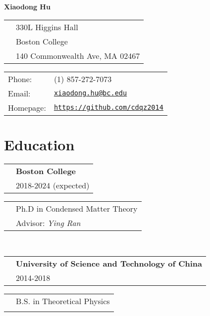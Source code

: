 \documentclass{article}
\def\name{Xiaodong Hu}
\begin{document}
\vspace{-2in}
{\huge\bf\name}
\hfill\\

\begin{minipage}{0.5\linewidth}
    \begin{tabular}{ll}
        & 330L Higgins Hall\\
        & Boston College\\
        & 140 Commonwealth Ave, MA 02467
    \end{tabular}
\end{minipage}
\begin{minipage}{0.5\linewidth}
  \begin{tabular}{ll}
    Phone: & (1) 857-272-7073 \\
    Email: & \href{mailto:xiaodong.hu@bc.edu}{\tt xiaodong.hu@bc.edu} \\
    Homepage: & \href{https://github.com/cdqz2014}{\tt https://github.com/cdqz2014} \\
  \end{tabular}
\end{minipage}

\makebox[\linewidth]{\rule{\linewidth}{0.4pt}}


\section*{Education}
\begin{minipage}{0.55\linewidth}
    \begin{tabular}{ll}
        & {\bf Boston College} \\
        & 2018-2024 (expected)        
    \end{tabular}
\end{minipage}
\begin{minipage}{0.45\linewidth}
    \begin{tabular}{ll}
        & Ph.D in Condensed Matter Theory\\
        & Advisor: \emph{Ying Ran}
    \end{tabular}
\end{minipage}
\\[1em]
\begin{minipage}{0.55\linewidth}
    \begin{tabular}{ll}
        & {\bf University of Science and Technology of China}\\
        & 2014-2018 
    \end{tabular}
\end{minipage}
\begin{minipage}{0.45\linewidth}
    \begin{tabular}{ll}
        & B.S. in Theoretical Physics\\
        & { }
    \end{tabular}
\end{minipage}
\end{document}

